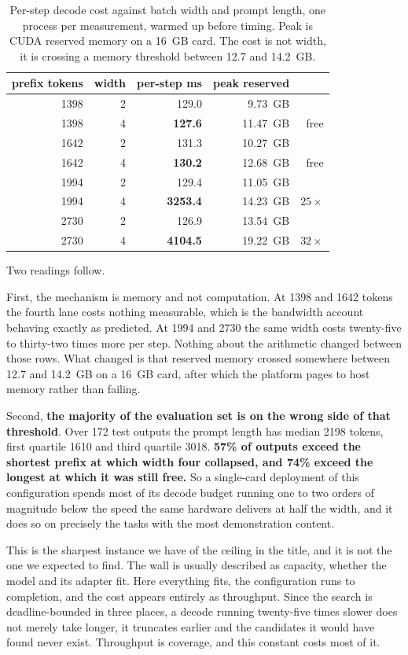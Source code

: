 \documentclass[11pt]{article}
\begin{document}
\begin{table}[H]
\centering
\small
\caption{Per-step decode cost against batch width and prompt length, one process per measurement,
warmed up before timing. Peak is CUDA reserved memory on a 16~GB card. The cost is not width, it is
crossing a memory threshold between 12.7 and 14.2~GB.}
\label{tab:widthcliff}
\begin{tabular}{rrrrr}
\toprule
prefix tokens & width & per-step ms & peak reserved & \\
\midrule
1398 & 2 & 129.0 & 9.73~GB & \\
1398 & 4 & \textbf{127.6} & 11.47~GB & free \\
1642 & 2 & 131.3 & 10.27~GB & \\
1642 & 4 & \textbf{130.2} & 12.68~GB & free \\
1994 & 2 & 129.4 & 11.05~GB & \\
1994 & 4 & \textbf{3253.4} & 14.23~GB & $25\times$ \\
2730 & 2 & 126.9 & 13.54~GB & \\
2730 & 4 & \textbf{4104.5} & 19.22~GB & $32\times$ \\
\bottomrule
\end{tabular}
\end{table}

Two readings follow.

First, the mechanism is memory and not computation. At 1398 and 1642 tokens the fourth lane costs
nothing measurable, which is the bandwidth account behaving exactly as predicted. At 1994 and 2730 the
same width costs twenty-five to thirty-two times more per step. Nothing about the arithmetic changed
between those rows. What changed is that reserved memory crossed somewhere between 12.7 and
14.2~GB on a 16~GB card, after which the platform pages to host memory rather than failing.

Second, \textbf{the majority of the evaluation set is on the wrong side of that threshold}. Over 172
test outputs the prompt length has median 2198 tokens, first quartile 1610 and third quartile 3018.
\textbf{57\% of outputs exceed the shortest prefix at which width four collapsed, and 74\% exceed the
longest at which it was still free.} So a single-card deployment of this configuration spends most of
its decode budget running one to two orders of magnitude below the speed the same hardware delivers
at half the width, and it does so on precisely the tasks with the most demonstration content.

This is the sharpest instance we have of the ceiling in the title, and it is not the one we expected
to find. The wall is usually described as capacity, whether the model and its adapter fit. Here
everything fits, the configuration runs to completion, and the cost appears entirely as throughput.
Since the search is deadline-bounded in three places, a decode running twenty-five times slower does
not merely take longer, it truncates earlier and the candidates it would have found never exist.
Throughput is coverage, and this constant costs most of it.
\end{document}
